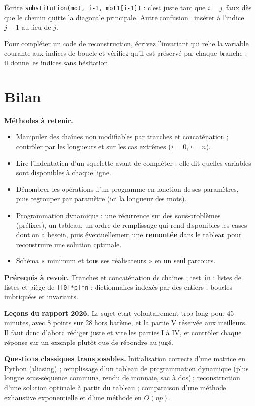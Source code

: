 \documentclass[11pt,a4paper]{article}
\providecommand{\tightlist}{\setlength{\itemsep}{0pt}\setlength{\parskip}{0pt}}
\begin{document}
\begin{piege}

Écrire \texttt{substitution(\allowbreak{}mot,\allowbreak{}\ i-1,\allowbreak{}\ mot1{[}i-1{]}\allowbreak{})\allowbreak{}} : c'est juste tant que \(i=j\), faux dès que le chemin quitte la diagonale principale. Autre confusion : insérer à l'indice \(j-1\) au lieu de \(j\).

\end{piege}

\begin{methode}

Pour compléter un code de reconstruction, écrivez l'invariant qui relie la variable courante aux indices de boucle et vérifiez qu'il est préservé par chaque branche : il donne les indices sans hésitation.

\end{methode}

\hypertarget{bilan}{%
\section{Bilan}\label{bilan}}

\textbf{Méthodes à retenir.}

\begin{itemize}
\tightlist
\item
  Manipuler des chaînes non modifiables par tranches et concaténation ; contrôler par les longueurs et sur les cas extrêmes (\(i=0\), \(i=n\)).
\item
  Lire l'indentation d'un squelette avant de compléter : elle dit quelles variables sont disponibles à chaque ligne.
\item
  Dénombrer les opérations d'un programme en fonction de ses paramètres, puis regrouper par paramètre (ici la longueur des mots).
\item
  Programmation dynamique : une récurrence sur des sous-problèmes (préfixes), un tableau, un ordre de remplissage qui rend disponibles les cases dont on a besoin, puis éventuellement une \textbf{remontée} dans le tableau pour reconstruire une solution optimale.
\item
  Schéma « minimum et tous ses réalisateurs » en un seul parcours.
\end{itemize}

\textbf{Prérequis à revoir.} Tranches et concaténation de chaînes ; test \texttt{in} ; listes de listes et piège de \texttt{{[}{[}0{]}*p{]}*n} ; dictionnaires indexés par des entiers ; boucles imbriquées et invariants.

\textbf{Leçons du rapport 2026.} Le sujet était volontairement trop long pour 45 minutes, avec 8 points sur 28 hors barème, et la partie V réservée aux meilleurs. Il faut donc d'abord rédiger juste et vite les parties I à IV, et contrôler chaque réponse sur un exemple plutôt que de répondre au jugé.

\textbf{Questions classiques transposables.} Initialisation correcte d'une matrice en Python (aliasing) ; remplissage d'un tableau de programmation dynamique (plus longue sous-séquence commune, rendu de monnaie, sac à dos) ; reconstruction d'une solution optimale à partir du tableau ; comparaison d'une méthode exhaustive exponentielle et d'une méthode en \(O(np)\).
\end{document}
